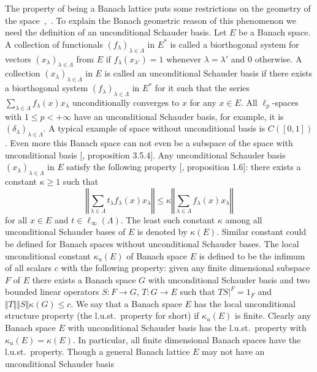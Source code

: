 The property of being a Banach lattice puts some restrictions on the geometry of
the space~\cite{SherOrderInOpAlg},~\cite{KadOrderPropOfBoundSAOps}. To explain
the Banach geometric reason of this phenomenon we need the definition of an
unconditional Schauder basis. Let $E$ be a Banach space. A collection of
functionals ${(f_\lambda)}_{\lambda\in\Lambda}$ in $E^*$ is called 
a biorthogonal system for vectors ${(x_\lambda)}_{\lambda\in\Lambda}$ 
from $E$ if $f_\lambda(x_{\lambda'})=1$ whenever $\lambda=\lambda'$ 
and $0$ otherwise. A collection ${(x_\lambda)}_{\lambda\in\Lambda}$ 
in $E$ is called an unconditional Schauder basis if there exists 
a biorthogonal system ${(f_\lambda)}_{\lambda\in\Lambda}$ in $E^*$ 
for it such that the series
$\sum_{\lambda\in\Lambda} f_\lambda(x)x_\lambda$ unconditionally converges to
$x$ for any $x\in E$. All $\ell_p$-spaces with $1\leq p<+\infty$ have an
unconditional Schauder basis, for example, it is
${(\delta_\lambda)}_{\lambda\in\Lambda}$. A typical example of space without
unconditional basis is $C([0,1])$. Even more this Banach space can not even be a
subspace of the space with unconditional basis [\cite{KalAlbTopicsBanSpTh},
proposition 3.5.4].  Any unconditional Schauder basis
${(x_\lambda)}_{\lambda\in\Lambda}$ in $E$ satisfy the following property
[\cite{DiestAbsSumOps}, proposition 1.6]: there exists a constant $\kappa\geq 1$
such that
$$
\left\Vert \sum_{\lambda\in\Lambda}t_\lambda f_\lambda(x)x_\lambda\right\Vert
\leq
\kappa\left\Vert \sum_{\lambda\in\Lambda}f_\lambda(x)x_\lambda\right\Vert
$$
for all $x\in E$ and $t\in\ell_\infty(\Lambda)$. The least such constant
$\kappa$ among all unconditional Schauder bases of $E$ is denoted by
$\kappa(E)$. Similar constant could be defined for Banach spaces without
unconditional Schauder bases. The local unconditional constant $\kappa_u(E)$ of
Banach space $E$ is defined to be the infimum of all scalars $c$ with the
following property: given any finite dimensional subspace $F$ of $E$ there
exists a Banach space $G$ with unconditional Schauder basis and two bounded
linear operators $S:F\to G$, $T:G\to E$ such that $TS|^{F}=1_F$ and $\Vert
T\Vert\Vert S\Vert\kappa(G)\leq c$. We say that a Banach space $E$ has the local
unconditional structure property (the l.u.st.\ property for short) if
$\kappa_u(E)$ is finite. Clearly any Banach space $E$ with unconditional
Schauder basis has the l.u.st.\ property with $\kappa_u(E)=\kappa(E)$. In
particular, all finite dimensional Banach spaces have the l.u.st.\ property.
Though a general Banach lattice $E$ may not have an unconditional Schauder basis

